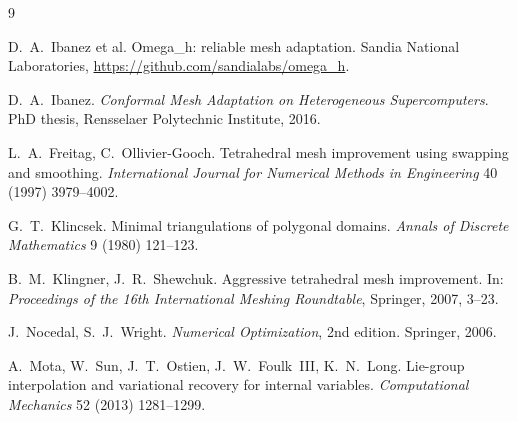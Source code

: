 \documentclass[11pt]{article}
\newcommand{\omegah}{Omega\_h}
\begin{document}
\begin{thebibliography}{9}

D.~A.~Ibanez et al.
\omegah{}: reliable mesh adaptation.
Sandia National Laboratories,
\url{https://github.com/sandialabs/omega_h}.

D.~A.~Ibanez.
\emph{Conformal Mesh Adaptation on Heterogeneous Supercomputers}.
PhD thesis, Rensselaer Polytechnic Institute, 2016.

L.~A.~Freitag, C.~Ollivier-Gooch.
Tetrahedral mesh improvement using swapping and smoothing.
\emph{International Journal for Numerical Methods in Engineering}
40 (1997) 3979--4002.

G.~T.~Klincsek.
Minimal triangulations of polygonal domains.
\emph{Annals of Discrete Mathematics} 9 (1980) 121--123.

B.~M.~Klingner, J.~R.~Shewchuk.
Aggressive tetrahedral mesh improvement.
In: \emph{Proceedings of the 16th International Meshing Roundtable},
Springer, 2007, 3--23.

J.~Nocedal, S.~J.~Wright.
\emph{Numerical Optimization}, 2nd edition.
Springer, 2006.

A.~Mota, W.~Sun, J.~T.~Ostien, J.~W.~Foulk~III, K.~N.~Long.
Lie-group interpolation and variational recovery for internal variables.
\emph{Computational Mechanics} 52 (2013) 1281--1299.

\end{thebibliography}
\end{document}
